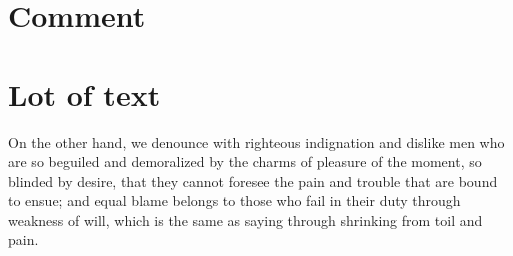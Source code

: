 \section{Comment}

\begin{comment}
  \begin{hola}[index=zapto!hoasd]{Principio de seguridad de los
      alimentos.}{articulo-8}
    On the other hand, we denounce with righteous indignation and dislike men
    who are so beguiled and demoralized by the charms of pleasure of the moment,
    so blinded by desire, that they cannot foresee the pain and trouble that are
    bound to ensue; and equal blame belongs to those who fail in their duty
    through weakness of will, which is the same as saying through shrinking from
    toil and pain.

    \tcblower

    \hfill \texttt{Ley 17/2011, de 5 de julio, de Seguridad Alimentaria y
      Nutrición}

    \hfill \textit{Fuente}: \url{https://www.boe.es/}
  \end{hola}
\end{comment}


\section{Lot of text}

On the other hand, we denounce with righteous indignation and dislike men who
are so beguiled and demoralized by the charms of pleasure of the moment, so
blinded by desire, that they cannot foresee the pain and trouble that are bound
to ensue; and equal blame belongs to those who fail in their duty through
weakness of will, which is the same as saying through shrinking from toil and
pain.

